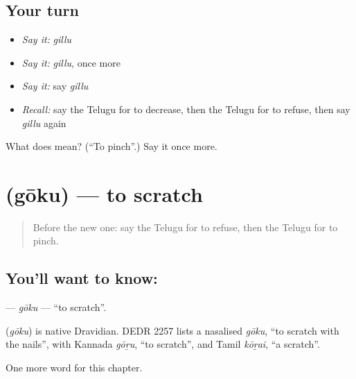\subsection*{Your turn}
\begin{itemize}
\raggedright
  \item \emph{Say it:} \emph{gillu}
  \item \emph{Say it:} \emph{gillu}, once more
  \item \emph{Say it:} say \emph{gillu}
  \item \emph{Recall:} say the Telugu for to decrease, then the Telugu for to refuse, then say \emph{gillu} again
\end{itemize}

\begin{tcolorbox}[breakable,colback=teal!4,colframe=teal!35!black,title={Before you move on}]
What does  mean? (\textquotedblleft{}To pinch\textquotedblright{}.) Say it once more.
\end{tcolorbox}
\section[\texorpdfstring{\te{గోకు} (gōku)}{గోకు (gōku)}]{ (gōku) — to scratch}

\label{lesson:TE-C247-goku}



\begin{quote}
Before the new one: say the Telugu for to refuse, then the Telugu for to pinch.
\end{quote}

\subsection*{You'll want to know: }
\textbf{} — \emph{gōku} — \textquotedblleft{}to scratch\textquotedblright{}.

\begin{cousinweb}
\textbf{} (\emph{gōku}) is native Dravidian. DEDR 2257 lists a nasalised \emph{gōku}, \textquotedblleft{}to scratch with the nails\textquotedblright{}, with Kannada \emph{gōṟu}, \textquotedblleft{}to scratch\textquotedblright{}, and Tamil \emph{kōṟai}, \textquotedblleft{}a scratch\textquotedblright{}.
\end{cousinweb}

\begin{grammarlens}[title={What you've built}]
One more word for this chapter.
\end{grammarlens}

